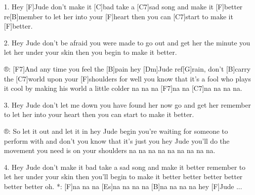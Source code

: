 
1. Hey [F]Jude don't make it [C]bad
take a [C7]sad song and make it [F]better
re[B]member to let her into your [F]heart
then you can [C7]start to make it [F]better.

2. Hey Jude don't be afraid
you were made to go out and get her
the minute you let her under your skin
then you begin to make it better.

®: [F7]And any time you feel the [B]pain hey [Dm]Jude ref[G]rain,
don't [B]carry the [C7]world upon your [F]shoulders
for well you know that it's a fool who plays it cool
by making his world a little colder
na na na [F7]na na [C7]na na na na.

3. Hey Jude don't let me down
you have found her now go and get her
remember to let her into your heart
then you can start to make it better.

®: So let it out and let it in hey Jude begin
you're waiting for someone to perform with
and don't you know that it's just you hey Jude you'll do
the movement you need is on your shoulders
na na na na na na na na na.

4. Hey Jude don't make it bad
take a sad song and make it better
remember to let her under your skin
then you'll begin to make it better
better better better better better oh.
*: [F]na na na [Es]na na na na [B]na na na na hey [F]Jude ...
